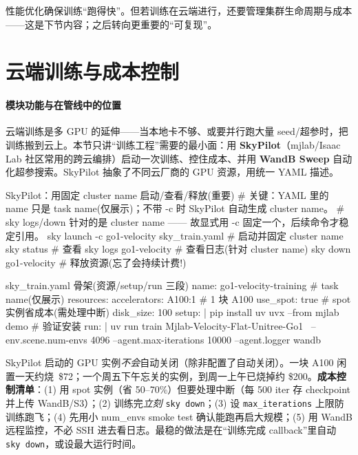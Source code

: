 性能优化确保训练“跑得快”。但若训练在云端进行，还要管理集群生命周期与成本——这是下节内容；之后转向更重要的“可复现”。

\section{云端训练与成本控制}
\label{sec:rlmc-ls-cloud}

\paragraph{\texorpdfstring{ 模块功能与在管线中的位置}{1 模块功能与在管线中的位置}}云端训练是多 GPU 的延伸——当本地卡不够、或要并行跑大量 seed/超参时，把训练搬到云上。本节只讲“训练工程”需要的最小面：用 \textbf{SkyPilot}（mjlab/Isaac Lab 社区常用的跨云编排）启动一次训练、控住成本、并用 \textbf{WandB Sweep} 自动化超参搜索。SkyPilot 抽象了不同云厂商的 GPU 资源，用统一 YAML 描述。

\begin{codebox}[bash]{SkyPilot：用固定 cluster name 启动/查看/释放(重要)}
# 关键：YAML 里的 name 只是 task name(仅展示)；不带 -c 时 SkyPilot 自动生成 cluster name。
# sky logs/down 针对的是 cluster name —— 故显式用 -c 固定一个，后续命令才稳定引用。
sky launch -c go1-velocity sky_train.yaml        # 启动并固定 cluster name
sky status                                        # 查看
sky logs go1-velocity                             # 查看日志(针对 cluster name)
sky down go1-velocity                             # 释放资源(忘了会持续计费!)
\end{codebox}

\begin{codebox}[text]{sky\_train.yaml 骨架(资源/setup/run 三段)}
name: go1-velocity-training        # task name(仅展示)
resources:
  accelerators: A100:1             # 1 块 A100
  use_spot: true                   # spot 实例省成本(需处理中断)
  disk_size: 100
setup: |
  pip install uv
  uvx --from mjlab demo            # 验证安装
run: |
  uv run train Mjlab-Velocity-Flat-Unitree-Go1 \
    --env.scene.num-envs 4096 --agent.max-iterations 10000 --agent.logger wandb
\end{codebox}

\begin{insight}\label{ins:rlmc-ls-cloud-cost}
SkyPilot 启动的 GPU 实例\emph{不会}自动关闭（除非配置了自动关闭）。一块 A100 闲置一天约烧 \pz{量级参考}\,\$72；一个周五下午忘关的实例，到周一上午已烧掉约 \$200。\textbf{成本控制清单}：(1) 用 spot 实例（省 50--70\%）但要处理中断（每 500 iter 存 checkpoint 并上传 WandB/S3）；(2) 训练完\emph{立刻} \verb|sky down|；(3) 设 \verb|max_iterations| 上限防训练跑飞；(4) 先用小 num\_envs smoke test 确认能跑再启大规模；(5) 用 WandB 远程监控，不必 SSH 进去看日志。最稳的做法是在“训练完成 callback”里自动 \verb|sky down|，或设最大运行时间。
\end{insight}

